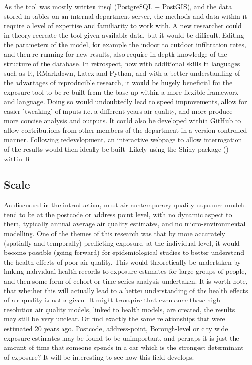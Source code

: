 As the tool was mostly written in\gls{sql} (PostgreSQL + PostGIS), and the data stored in tables on an internal department server, the methods and data within it require a level of expertise and familiarity to work with. A new researcher could in theory recreate the tool given available data, but it would be difficult. Editing the parameters of the model, for example the indoor to outdoor infiltration rates, and then re-running for new results, also require in-depth knowledge of the structure of the database.  In retrospect, now with additional skills in languages such as R, RMarkdown, Latex and Python, and with a better understanding of the advantages of reproducible research, it would be hugely beneficial for the exposure tool to be re-built from the base up within a more flexible framework and language. Doing so would undoubtedly lead to speed improvements, allow for easier 'tweaking' of inputs i.e. a different years air quality, and more produce more concise analysis and outputs. It could also be developed within GitHub to allow contributions from other members of the department in a version-controlled manner. Following redevelopment, an interactive webpage to allow interrogation of the results would then ideally be built. Likely using the Shiny package (\cite{shiny2018}) within R.

\subsection{Scale}
\label{subsec:model_scale}

As discussed in the introduction, most air contemporary quality exposure models tend to be at the postcode or address point level, with no dynamic aspect to them, typically annual average air quality estimates, and no micro-environmental modelling. One of the themes of this research was that by more accurately (spatially and temporally) predicting exposure, at the individual level, it would become possible (going forward) for epidemiological studies to better understand the health effects of poor air quality. This would theoretically be undertaken by linking individual health records to exposure estimates for large groups of people, and then some form of cohort or time-series analysis undertaken. It is worth note, that whether this will actually lead to a better understanding of the health effects of air quality is not a given. It might transpire that even once these high resolution air quality models, linked to health models, are created, the results may still be very unclear. Or find exactly the same relationships that were estimated 20 years ago. Postcode, address-point, Borough-level or city wide exposure estimates may be found to be unimportant, and perhaps it is just the amount of time that someone spends in a car which is the strongest determinant of exposure? It will be interesting to see how this field develops.

